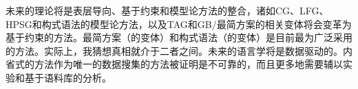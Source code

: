 未来的理论将是表层导向、基于约束和模型论方法的整合，诸如CG\indexcg、LFG\indexlfg、HPSG\indexhpsg 和构式语法\indexcxg 的模型论方法，以及TAG\indextag 和GB/最简方案\indexgb \indexmp 的相关变体将会变革为基于约束的方法。最简方案（的变体）和构式语法（的变体）是目前最为广泛采用的方法。实际上，我猜想真相就介于二者之间。未来的语言学将是数据驱动的。内省式的方法作为唯一的数据搜集的方法被证明是不可靠的\citep{Mueller2007c,MM2009a}，而且更多地需要辅以实验和基于语料库的分析。

